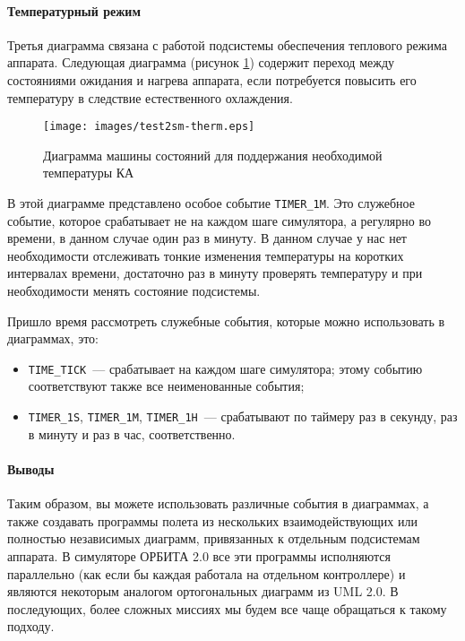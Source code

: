 \documentclass[12pt,a4paper]{article}
\begin{document}
\paragraph{Температурный режим} Третья диаграмма связана с работой подсистемы обеспечения
теплового режима аппарата. Следующая диаграмма (рисунок \ref{Pic:Test2SM-Therm}) содержит
переход между состояниями ожидания и нагрева аппарата, если потребуется повысить его
температуру в следствие естественного охлаждения.

\begin{figure}[tbh]
  \begin{center}
    \texttt{[image: images/test2sm-therm.eps]}
    \caption{Диаграмма машины состояний для поддержания необходимой температуры КА}
    \label{Pic:Test2SM-Therm}
  \end{center}
\end{figure}

В этой диаграмме представлено особое событие \verb'TIMER_1M'. Это служебное событие,
которое срабатывает не на каждом шаге симулятора, а регулярно во времени, в данном случае
один раз в минуту. В данном случае у нас нет необходимости отслеживать тонкие изменения
температуры на коротких интервалах времени, достаточно раз в минуту проверять температуру
и при необходимости менять состояние подсистемы.

Пришло время рассмотреть служебные события, которые можно использовать в диаграммах, это:

\begin{itemize}
\item \verb'TIME_TICK'~--- срабатывает на каждом шаге симулятора; этому событию соответствуют
  также все неименованные события;
\item \verb'TIMER_1S', \verb'TIMER_1M', \verb'TIMER_1H'~--- срабатывают по таймеру раз в
  секунду, раз в минуту и раз в час, соответственно.
\end{itemize}

\paragraph{Выводы} Таким образом, вы можете использовать различные события в диаграммах, а
также создавать программы полета из нескольких взаимодействующих или полностью независимых
диаграмм, привязанных к отдельным подсистемам аппарата. В симуляторе ОРБИТА 2.0 все эти
программы исполняются параллельно (как если бы каждая работала на отдельном контроллере) и
являются некоторым аналогом ортогональных диаграмм из UML 2.0. В последующих, более
сложных миссиях мы будем все чаще обращаться к такому подходу.
\end{document}
